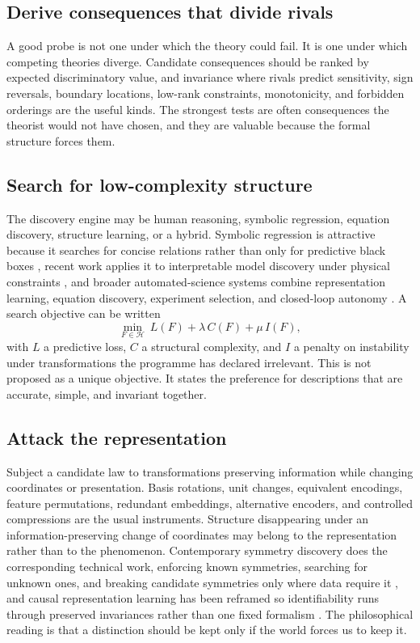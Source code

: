 \documentclass[11pt]{article}
\theoremstyle{remark}
\begin{document}
\subsection{Derive consequences that divide rivals}

A good probe is not one under which the theory could fail. It is one under which
competing theories diverge. Candidate consequences should be ranked by expected
discriminatory value, and invariance where rivals predict sensitivity, sign
reversals, boundary locations, low-rank constraints, monotonicity, and forbidden
orderings are the useful kinds. The strongest tests are often consequences the
theorist would not have chosen, and they are valuable because the formal structure
forces them.

\subsection{Search for low-complexity structure}

The discovery engine may be human reasoning, symbolic regression, equation
discovery, structure learning, or a hybrid. Symbolic regression is attractive
because it searches for concise relations rather than only for predictive black
boxes \citep{makke2024}, recent work applies it to interpretable model discovery
under physical constraints \citep{hou2024}, and broader automated-science systems
combine representation learning, equation discovery, experiment selection, and
closed-loop autonomy \citep{kramer2026}. A search objective can be written
\begin{equation}
\min_{F \in \mathcal{H}} \ L(F) + \lambda\, C(F) + \mu\, I(F),
\end{equation}
with $L$ a predictive loss, $C$ a structural complexity, and $I$ a penalty on
instability under transformations the programme has declared irrelevant. This is
not proposed as a unique objective. It states the preference for descriptions that
are accurate, simple, and invariant together.

\subsection{Attack the representation}

Subject a candidate law to transformations preserving information while changing
coordinates or presentation. Basis rotations, unit changes, equivalent encodings,
feature permutations, redundant embeddings, alternative encoders, and controlled
compressions are the usual instruments. Structure disappearing under an
information-preserving change of coordinates may belong to the representation
rather than to the phenomenon. Contemporary symmetry discovery does the
corresponding technical work, enforcing known symmetries, searching for unknown
ones, and breaking candidate symmetries only where data require it
\citep{otto2025}, and causal representation learning has been reframed so
identifiability runs through preserved invariances rather than one fixed formalism
\citep{yao2025}. The philosophical reading is that a distinction should be kept
only if the world forces us to keep it.
\end{document}
